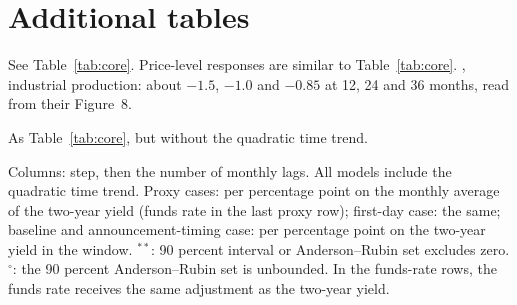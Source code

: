 \documentclass[11pt]{article}
\begin{document}
\section{Additional tables}
\begin{table}[H]\centering\small
\caption{Responses with industrial production added to the monthly model}\label{tab:ip}
{\setlength{\tabcolsep}{4pt}\resizebox{\ifdim\width>\linewidth\linewidth\else\width\fi}{!}{}}
\par\smallskip\begin{minipage}{0.95\textwidth}\footnotesize See Table~\ref{tab:core}. Price-level responses are similar to Table~\ref{tab:core}. \citet{bauer2023}, industrial production: about $-1.5$, $-1.0$ and $-0.85$ at 12, 24 and 36 months, read from their Figure~8.\end{minipage}
\end{table}
\begin{table}[H]\centering\small
\caption{Main steps without the time trend}\label{tab:notrend}
{\setlength{\tabcolsep}{4pt}\resizebox{\ifdim\width>\linewidth\linewidth\else\width\fi}{!}{}}
\par\smallskip\begin{minipage}{0.95\textwidth}\footnotesize As Table~\ref{tab:core}, but without the quadratic time trend.\end{minipage}
\end{table}
\begin{table}[H]\centering\small
\caption{Comparison with purely monthly VARs}\label{tab:monthly}
{\setlength{\tabcolsep}{3pt}\resizebox{\ifdim\width>\linewidth\linewidth\else\width\fi}{!}{}}
\par\smallskip\begin{minipage}{0.95\textwidth}\footnotesize Columns: step, then the number of monthly lags. All models include the quadratic time trend. Proxy cases: per percentage point on the monthly average of the two-year yield (funds rate in the last proxy row); first-day case: the same; baseline and announcement-timing case: per percentage point on the two-year yield in the window. $^{**}$: 90 percent interval or Anderson--Rubin set excludes zero. $^{\circ}$: the 90 percent Anderson--Rubin set is unbounded. In the funds-rate rows, the funds rate receives the same adjustment as the two-year yield.\end{minipage}
\end{table}
\end{document}
